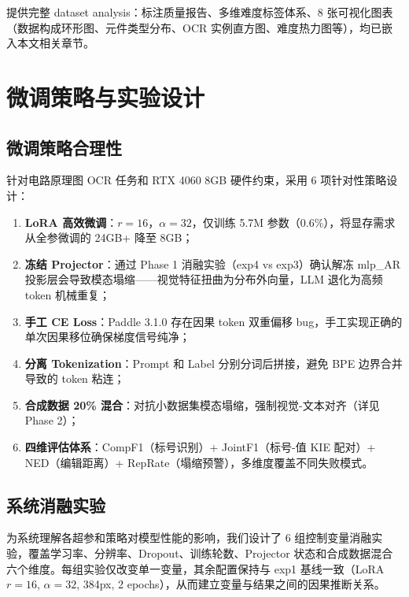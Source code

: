 提供完整 dataset analysis：标注质量报告、多维难度标签体系、8 张可视化图表（数据构成环形图、元件类型分布、OCR 实例直方图、难度热力图等），均已嵌入本文相关章节。

\section{微调策略与实验设计}

\subsection{微调策略合理性}

针对电路原理图 OCR 任务和 RTX 4060 8GB 硬件约束，采用 6 项针对性策略设计：

\begin{enumerate}[nosep]
    \item \textbf{LoRA 高效微调}：$r=16$，$\alpha=32$，仅训练 5.7M 参数（0.6\%），将显存需求从全参微调的 24GB+ 降至 8GB；
    \item \textbf{冻结 Projector}：通过 Phase 1 消融实验（exp4 vs exp3）确认解冻 mlp\_AR 投影层会导致模态塌缩——视觉特征扭曲为分布外向量，LLM 退化为高频 token 机械重复；
    \item \textbf{手工 CE Loss}：Paddle 3.1.0 存在因果 token 双重偏移 bug，手工实现正确的单次因果移位确保梯度信号纯净；
    \item \textbf{分离 Tokenization}：Prompt 和 Label 分别分词后拼接，避免 BPE 边界合并导致的 token 粘连；
    \item \textbf{合成数据 20\% 混合}：对抗小数据集模态塌缩，强制视觉-文本对齐（详见 Phase 2）；
    \item \textbf{四维评估体系}：CompF1（标号识别）+ JointF1（标号-值 KIE 配对）+ NED（编辑距离）+ RepRate（塌缩预警），多维度覆盖不同失败模式。
\end{enumerate}

\subsection{系统消融实验}

为系统理解各超参和策略对模型性能的影响，我们设计了 6 组控制变量消融实验，覆盖学习率、分辨率、Dropout、训练轮数、Projector 状态和合成数据混合六个维度。每组实验仅改变单一变量，其余配置保持与 exp1 基线一致（LoRA $r=16$, $\alpha=32$, 384px, 2 epochs），从而建立变量与结果之间的因果推断关系。


